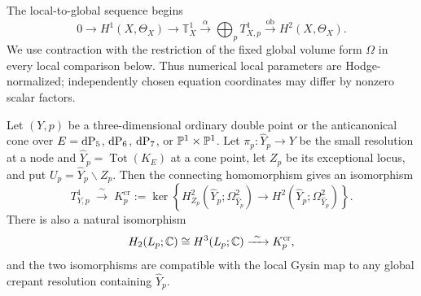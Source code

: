 The local-to-global sequence begins
\[
 0\longrightarrow H^1(X,\Theta_X)\longrightarrow\mathbb T^1_X
 \xrightarrow{\alpha}\bigoplus_pT^1_{X,p}
 \xrightarrow{\mathrm{ob}}H^2(X,\Theta_X).
\]
We use contraction with the restriction of the fixed global volume
form $\Omega$ in every local comparison below. Thus numerical local
parameters are Hodge-normalized; independently chosen equation
coordinates may differ by nonzero scalar factors.

\begin{lemma}\label{lem:localhodge}
Let $(Y,p)$ be a three-dimensional ordinary double point or the anticanonical
cone over $E=\mathrm{dP}_5$, $\mathrm{dP}_6$, $\mathrm{dP}_7$, or $\mathbb{P}^1\times\mathbb{P}^1$.  Let
$\pi_p\colon\widehat Y_p\to Y$ be the small resolution at a node and
$\widehat Y_p=\operatorname{Tot}(K_E)$ at a cone point, let $Z_p$ be its
exceptional locus, and put $U_p=\widehat Y_p\smallsetminus Z_p$.  Then the
connecting homomorphism gives an isomorphism
\begin{equation}\label{eq:localhodge}
 T^1_{Y,p}\;\xrightarrow{\ \sim\ }\;
 K_p^{\mathrm{cr}}:=
 \ker\!\left\{H^2_{Z_p}(\widehat Y_p;\Omega^2_{\widehat Y_p})
 \longrightarrow H^2(\widehat Y_p;\Omega^2_{\widehat Y_p})\right\}.
\end{equation}
There is also a natural isomorphism
\begin{equation}\label{eq:linklocalhodge}
 H_2(L_p;\mathbb{C})\cong H^3(L_p;\mathbb{C})
 \xrightarrow{\ \sim\ }K_p^{\mathrm{cr}},
\end{equation}
and the two isomorphisms are compatible with the local Gysin map to any global
crepant resolution containing $\widehat Y_p$.
\end{lemma}

